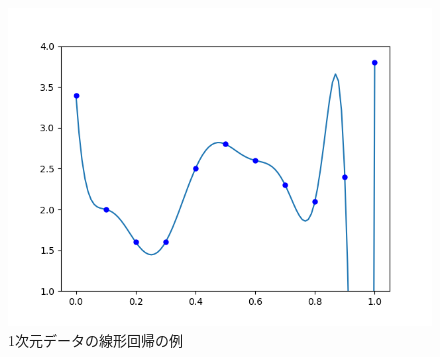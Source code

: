 \documentclass[a4paper,11pt]{jsreport}
\begin{document}
\begin{figure}[htbp]
\begin{minipage}[b]{0.3\linewidth}
    \includegraphics[keepaspectratio, scale=0.3]{image/多項式回帰(c).png}
  \end{minipage}
  \caption{1次元データの線形回帰の例}
  \label{線形回帰}
\end{figure}
\end{document}
